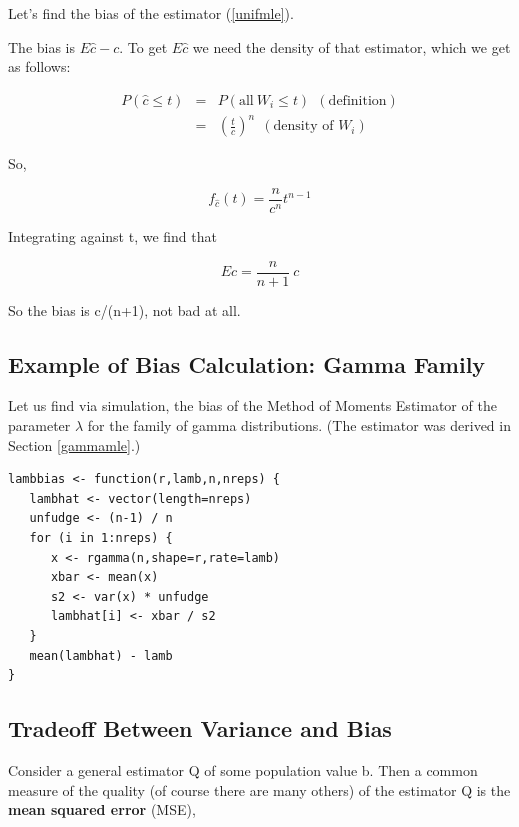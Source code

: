 Let's find the bias of the estimator (\ref{unifmle}).

The bias is $E\widehat{c} - c$.  To get $E\widehat{c}$ we need the
density of that estimator, which we get as follows:

\begin{eqnarray}
P(\widehat{c} \leq t) &=& P(\textrm{all} ~ W_i \leq t)  ~~ (\textrm{definition})\\
&=& \left ( \frac{t}{c} \right )^n ~~ (\textrm{density of } W_i)
\end{eqnarray}

So,

\begin{equation}
f_{\widehat{c}}(t) = \frac{n}{c^n}  t^{n-1}
\end{equation}

Integrating against t, we find that

\begin{equation}
\label{notbad}
E\widehat{c} = \frac{n}{n+1} ~ c
\end{equation}

So the bias is c/(n+1), not bad at all.

\subsection{Example of Bias Calculation:  Gamma Family}

Let us find via simulation, the bias of the Method of Moments Estimator
of the parameter $\lambda$ for the family of gamma distributions.
(The estimator was derived in Section \ref{gammamle}.)

\begin{lstlisting}
lambbias <- function(r,lamb,n,nreps) {
   lambhat <- vector(length=nreps)
   unfudge <- (n-1) / n
   for (i in 1:nreps) {
      x <- rgamma(n,shape=r,rate=lamb)
      xbar <- mean(x)
      s2 <- var(x) * unfudge
      lambhat[i] <- xbar / s2
   }
   mean(lambhat) - lamb
}
\end{lstlisting}

\subsection{Tradeoff Between Variance and Bias}
\label{msesection}

Consider a general estimator Q of some population value b.  Then a
common measure of the quality (of course there are many others) of the
estimator Q is the {\bf mean squared error} (MSE),

